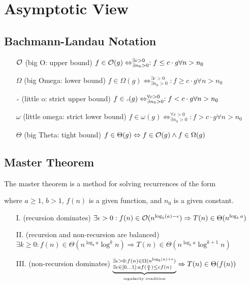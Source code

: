 \documentclass{article}
\author{Leopold Lemmermann}
\begin{document}
\createtitle

\section{Asymptotic View}
\subsection{Bachmann-Landau Notation}
\begin{itemize}
  \item[$\mathcal{O}$] (big O: upper bound) $f\in \mathcal{O}(g) \Leftrightarrow ^{\exists c > 0}_{\exists n_0 > 0}: f \leq c \cdot g \forall n > n_0$
  \item[$\Omega$] (big Omega: lower bound) $f\in \Omega(g) \Leftrightarrow ^{\exists c > 0}_{\exists n_0 > 0}: f \geq c \cdot g \forall n > n_0$
  \item[$\littleO$] (little o: strict upper bound) $f\in \littleO(g) \Leftrightarrow ^{\forall c > 0}_{\exists n_0 > 0}: f < c \cdot g \forall n > n_0$
  \item[$\omega$] (little omega: strict lower bound) $f\in \omega(g) \Leftrightarrow ^{\forall c > 0}_{\exists n_0 > 0}: f > c \cdot g \forall n > n_0$
  \item[$\Theta$] (big Theta: tight bound) $f\in \Theta(g) \Leftrightarrow f\in \mathcal{O}(g) \land f\in \Omega(g)$
\end{itemize}

\subsection{Master Theorem}
The master theorem is a method for solving recurrences of the form

where $a \geq 1$, $b > 1$, $f(n)$ is a given function, and $n_0$ is a given constant.

\begin{itemize}
  \item[I.] (recursion dominates) $\exists \epsilon > 0: f(n) \in \mathcal{O}(n^{\log_b(a)-\epsilon}) \Rightarrow T(n) \in \Theta(n^{\log_b a})$
  \item[II.] (recursion and non-recursion are balanced) $\exists k \ge 0: f(n) \in \Theta(n^{\log_b a}\log^k n) \Rightarrow T(n) \in \Theta(n^{\log_b a} \log^{k+1} n)$
  \item[III.] (non-recursion dominates) $\underbrace{^{\exists \epsilon > 0: f(n) \in \Omega(n^{\log_b(a)+\epsilon})}_{\exists c \in [0\dots1]: a f(\frac{n}{b}) \leq c f(n)}}_{\text{\tiny regularity condition}} \Rightarrow T(n) \in \Theta(f(n))$
\end{itemize}
\end{document}

